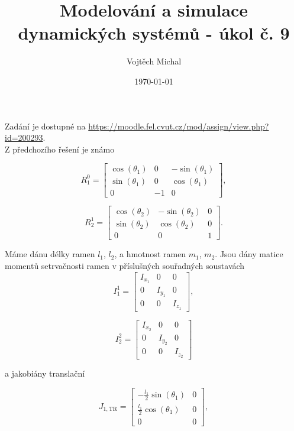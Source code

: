 \documentclass[twoside]{article}
\title{Modelování a simulace dynamických systémů - úkol č. 9}
\author{Vojtěch Michal}
\date{\today}
\begin{document}
\maketitle

Zadání je dostupné na \url{https://moodle.fel.cvut.cz/mod/assign/view.php?id=200293}. \\

Z předchozího řešení je známo

\begin{equation}
	R_1^0 = \begin{bmatrix}
		\cos(\theta_1) & 0 & -\sin(\theta_1) \\
		\sin(\theta_1) & 0 & \cos(\theta_1) \\
		0 & -1 & 0 
	\end{bmatrix},
\end{equation}

\begin{equation}
	R_2^1 = \begin{bmatrix}
		\cos(\theta_2) & -\sin(\theta_2) & 0 \\
		\sin(\theta_2) & \cos(\theta_2) & 0 \\
		0 & 0 & 1 
	\end{bmatrix}.
\end{equation}

Máme dánu délky ramen $l_1$, $l_2$, a hmotnost ramen $m_1$, $m_2$.
Jsou dány matice momentů setrvačnosti ramen v příslušných souřadných soustavách
\begin{equation}
	I_1^1 = \begin{bmatrix}
		I_{x_1} & 0 &0 \\
		0 & I_{y_1} &0 \\
		0 & 0 & I_{z_1} 
	\end{bmatrix},
\end{equation}

\begin{equation}
	I_2^2 = \begin{bmatrix}
		I_{x_2} & 0 &0 \\
		0 & I_{y_2} &0 \\
		0 & 0 & I_{z_2} 
	\end{bmatrix}
\end{equation}

a jakobiány translační

\begin{equation}
	J_{1, \text{TR}} = \begin{bmatrix}
		-\frac{l_1}{2} \sin(\theta_1) & 0 \\
		\frac{l_1}{2} \cos(\theta_1) & 0 \\
		0 & 0
	\end{bmatrix},
\end{equation}
\end{document}
